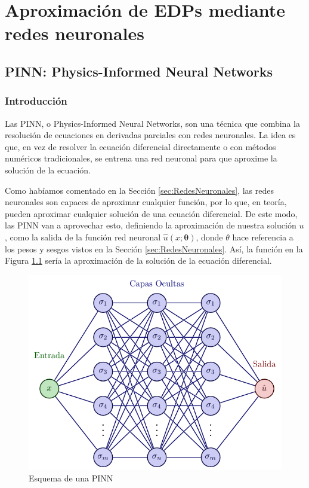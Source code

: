 \documentclass[a4paper,11pt,spanish, twoside, leqno]{tfg-uam}
\theoremstyle{definition}
\begin{document}
\chapter{Aproximación de EDPs mediante redes neuronales}\label{chap2}

\section{PINN: Physics-Informed Neural Networks}
\subsection{Introducción}
Las PINN, o Physics-Informed Neural Networks, son una técnica que combina la resolución de ecuaciones en derivadas parciales con redes neuronales. La idea es que, en vez de resolver la ecuación diferencial directamente o con métodos numéricos tradicionales, se entrena una red neuronal para que aproxime la solución de la ecuación. 

Como habíamos comentado en la Sección \ref{sec:RedesNeuronales}, las redes neuronales son capaces de aproximar cualquier función, por lo que, en teoría, pueden aproximar cualquier solución de una ecuación diferencial. De este modo, las PINN van a aprovechar esto, definiendo la aproximación de nuestra solución ${u}$, como la salida de la función red neuronal $\hat{u}(x;\mathbf{\theta})$,  donde $\theta$ hace referencia a los pesos y sesgos vistos en la Sección \ref{sec:RedesNeuronales}. Así, la función en la Figura \ref{fig:PIN} sería la aproximación de la solución de la ecuación diferencial.
\begin{figure}[htbp]
    \centering
    \label{fig:PIN}
    \includegraphics[scale=0.6]{Figuras/neural_network_improved.pdf}
    \caption{Esquema de una PINN}
\end{figure}
\end{document}
